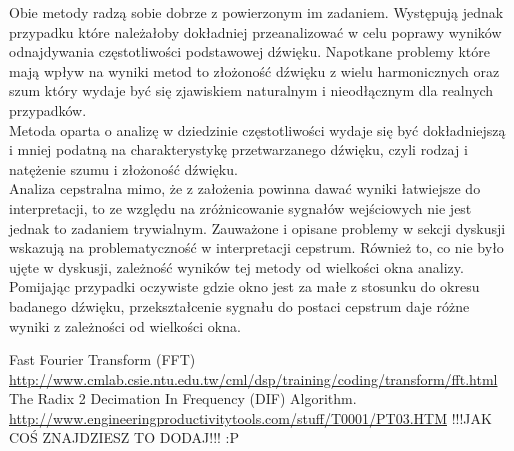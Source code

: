 \documentclass{classrep}
\begin{document}
Obie metody radzą sobie dobrze z powierzonym im zadaniem. Występują jednak przypadku które należałoby dokładniej przeanalizować w celu poprawy wyników odnajdywania częstotliwości podstawowej dźwięku. Napotkane problemy które mają wpływ na wyniki metod to złożoność dźwięku z wielu harmonicznych oraz szum który wydaje być się zjawiskiem naturalnym i nieodłącznym dla realnych przypadków.\\
\indent Metoda oparta o analizę w dziedzinie częstotliwości wydaje się być dokładniejszą i mniej podatną na charakterystykę przetwarzanego dźwięku, czyli rodzaj i natężenie szumu i złożoność dźwięku.\\
\indent Analiza cepstralna mimo, że z założenia powinna dawać wyniki łatwiejsze do interpretacji, to ze względu na zróżnicowanie sygnałów wejściowych nie jest jednak to zadaniem trywialnym. Zauważone i opisane problemy w sekcji dyskusji wskazują na problematyczność w interpretacji cepstrum. Również to, co nie było ujęte w dyskusji, zależność wyników tej metody od wielkości okna analizy. Pomijając przypadki oczywiste gdzie okno jest za małe z stosunku do okresu badanego dźwięku, przekształcenie sygnału do postaci cepstrum daje różne wyniki z zależności od wielkości okna.


\begin{thebibliography}{8}

 Fast Fourier Transform (FFT) \url{http://www.cmlab.csie.ntu.edu.tw/cml/dsp/training/coding/transform/fft.html}
 The Radix 2 Decimation In Frequency (DIF) Algorithm.  \url{http://www.engineeringproductivitytools.com/stuff/T0001/PT03.HTM}
 !!!JAK COŚ ZNAJDZIESZ TO DODAJ!!! :P


\end{thebibliography}
\end{document}

